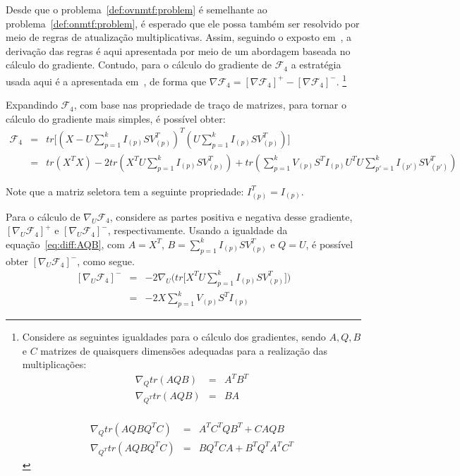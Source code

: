 \documentclass[
    12pt,                %
    oneside,            %
    a4paper,            %
    english,            %
    brazil                %
    ]{abntex2ppgsi}
\newcommand\blfootnote[1]{%
  \begingroup
  \renewcommand\thefootnote{}\footnote{#1}%
  \addtocounter{footnote}{-1}%
  \endgroup
}
\begin{document}
Desde que o problema~\ref{def:ovnmtf:problem} é semelhante ao problema~\ref{def:onmtf:problem}, é esperado que ele possa também ser resolvido por meio de regras de atualização multiplicativas.
Assim, seguindo o exposto em~\cite{Yoo2010}, a derivação das regras é aqui apresentada por meio de um abordagem baseada no cálculo do gradiente.
Contudo, para o cálculo do gradiente de $\mathcal{F}_4$ a estratégia usada aqui é a apresentada em~, de forma que $\nabla \mathcal{F}_4 = [\nabla \mathcal{F}_4]^+ - [\nabla \mathcal{F}_4]^-$.\blfootnote{Considere as seguintes igualdades para o cálculo dos gradientes, sendo $A, Q, B$ e $C$ matrizes de quaisquers dimensões adequadas para a realização das multiplicações:
\begin{equation}
\label{eq:diff:AQB}
\begin{array}{lcl}
\nabla_Q tr( AQB )     & = & A^T B^T \\
\nabla_{Q^T} tr( AQB ) & = & BA \\
\end{array}
\end{equation}

\begin{equation}
\label{eq:diff:AQBQtC}
\begin{array}{lcl}
\nabla_Q tr( AQBQ^TC )     & = & A^TC^TQB^T + CAQB \\
\nabla_{Q^T} tr( AQBQ^TC ) & = & BQ^TCA + B^TQ^TA^TC^T
\end{array}
\end{equation}
}

Expandindo $\mathcal{F}_4$, com base nas propriedade de traço de matrizes, para tornar o cálculo do gradiente mais simples, é possível obter:
\[
\begin{array}{lcl}
\displaystyle \mathcal{F}_4 & = & tr\big[ (X - U\sum_{p=1}^{k}I_{(p)}SV_{(p)}^T)^T (U\sum_{p=1}^{k}I_{(p)}SV_{(p)}^T) \big] \\
& = & tr(X^TX) - 2 tr( X^T U \sum_{p=1}^{k} I_{(p)} S V_{(p)}^T ) + tr( \sum_{p=1}^{k} V_{(p)} S^T I_{(p)} U^T U \sum_{p'=1}^k I_{(p')} S V_{(p')}^T )
\end{array}
\]

Note que a matriz seletora tem a seguinte propriedade: $I_{(p)}^T = I_{(p)}$.

Para o cálculo de $\nabla_U \mathcal{F}_4$, considere as partes positiva e negativa desse gradiente, $[\nabla_U \mathcal{F}_4]^+$ e $[\nabla_U \mathcal{F}_4]^-$, respectivamente.
Usando a igualdade da equação~\ref{eq:diff:AQB}, com $A = X^T$, $B = \sum_{p=1}^{k}I_{(p)}SV_{(p)}^T$ e $Q = U$, é possível obter $[\nabla_U \mathcal{F}_4]^-$, como segue.
\[
\begin{array}{lcl}
[\nabla_U \mathcal{F}_4]^- & = & - 2 \nabla_U \Big( tr\big[ X^T U \sum_{p=1}^{k}I_{(p)}SV_{(p)}^T \big] \Big) \\
& = & - 2 X \sum_{p=1}^{k} V_{(p)} S^T I_{(p)}
\end{array}
\]
\end{document}
